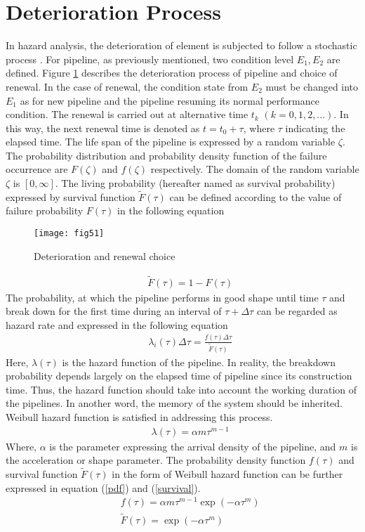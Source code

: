 \documentclass[a4paper,oneside,onecolumn,preprint,10pt,authoryear]{elsarticle}
\begin{document}
\section{Deterioration Process}
\label{54}
In hazard analysis, the deterioration of element is subjected to follow a stochastic process \cite{lancaster90}. For pipeline, as previously mentioned, two condition level $E_1, E_2$ are defined. Figure \ref{fig51} describes the deterioration process of pipeline and choice of renewal. In the case of renewal, the condition state from $E_2$ must be changed into $E_1$ as for new pipeline and the pipeline resuming its normal performance condition. The renewal is carried out at alternative time $t_k$ $(k=0,1,2,...)$. In this way, the next renewal time is denoted as $t=t_0+\tau$, where $\tau$ indicating the elapsed time. The life span of the pipeline is expressed by a random variable $\zeta$. The probability distribution and probability density function of the failure occurrence are $F(\zeta)$ and $f(\zeta)$ respectively. The domain of the random variable $\zeta$ is $[0,\infty]$. The living probability (hereafter named as survival probability) expressed by survival function $\tilde{F}(\tau)$ can be defined according to the value of failure probability $F(\tau)$ in the following equation
\begin{figure}
\begin{center}
\texttt{[image: fig51]} 
\end{center}
\caption{Deterioration and renewal choice}
\label{fig51} 
\end{figure}

\begin{eqnarray}
&& \tilde{F}(\tau) = 1 - F(\tau) \label{funcbF5}
\end{eqnarray}
The probability, at which the pipeline performs in good shape until time $\tau$ and break down for the first time during an interval of $\tau+\Delta\tau$ can be regarded as hazard rate and expressed in the following equation
\begin{eqnarray}
&& \lambda_i(\tau) \Delta \tau = \frac{f(\tau)\Delta \tau}{\tilde{F}(\tau)}  \label{riskbF5}
\end{eqnarray}
Here, $\lambda(\tau)$ is the hazard function of the pipeline. In reality, the breakdown probability depends largely on the elapsed time of pipeline since its construction time. Thus, the hazard function should take into account the working duration of the pipelines. In another word, the memory of the system should be inherited. Weibull hazard function is satisfied in addressing this process.
\begin{eqnarray}
&& \lambda(\tau)= \alpha m \tau^{m-1} \label{weibul}
\end{eqnarray}
Where, $\alpha$ is the parameter expressing the arrival density of the pipeline, and $m$ is the acceleration or shape parameter. The probability density function $f(\tau)$ and survival function $\tilde{F}(\tau)$ in the form of Weibull hazard function can be further expressed in equation (\ref{pdf}) and (\ref{survival}).
\begin{eqnarray}
&& f(\tau)=\alpha m\tau^{m-1}\exp(-\alpha \tau^m) \label{pdf} \\
&& \tilde{F}(\tau)=\exp(-\alpha \tau^m) \label{survival}
\end{eqnarray}
\end{document}
